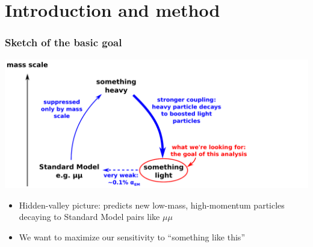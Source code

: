 \documentclass[compress]{beamer}
\begin{document}

\small

\section*{Introduction and method}


\begin{frame}
\frametitle{Sketch of the basic goal}
\includegraphics[width=\linewidth]{basic_picture.pdf}

\vspace{0.5 cm}
\begin{itemize}
\item Hidden-valley picture: predicts new low-mass, high-momentum particles decaying to Standard Model pairs like $\mu\mu$
\item We want to maximize our sensitivity to ``something like this''
\end{itemize}
\end{frame}
\end{document}
